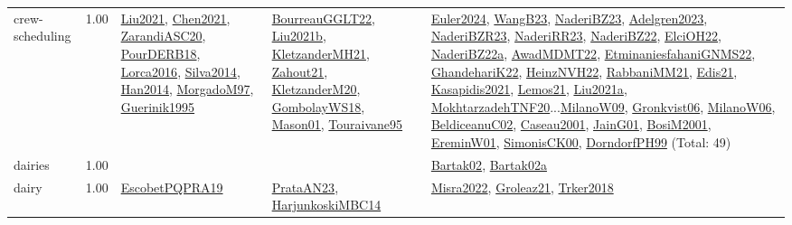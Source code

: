 {\begin{longtable}{p{3cm}r>{\raggedright\arraybackslash}p{6cm}>{\raggedright\arraybackslash}p{6cm}>{\raggedright\arraybackslash}p{8cm}}
\index{crew-scheduling}\index{ApplicationAreas!crew-scheduling}crew-scheduling &  1.00 & \hyperref[detail:Liu2021]{Liu2021}, \hyperref[detail:Chen2021]{Chen2021}, \hyperref[detail:ZarandiASC20]{ZarandiASC20}, \hyperref[detail:PourDERB18]{PourDERB18}, \hyperref[detail:Lorca2016]{Lorca2016}, \hyperref[detail:Silva2014]{Silva2014}, \hyperref[detail:Han2014]{Han2014}, \hyperref[detail:MorgadoM97]{MorgadoM97}, \hyperref[detail:Guerinik1995]{Guerinik1995} & \hyperref[detail:BourreauGGLT22]{BourreauGGLT22}, \hyperref[detail:Liu2021b]{Liu2021b}, \hyperref[detail:KletzanderMH21]{KletzanderMH21}, \hyperref[detail:Zahout21]{Zahout21}, \hyperref[detail:KletzanderM20]{KletzanderM20}, \hyperref[detail:GombolayWS18]{GombolayWS18}, \hyperref[detail:Mason01]{Mason01}, \hyperref[detail:Touraivane95]{Touraivane95} & \hyperref[detail:Euler2024]{Euler2024}, \hyperref[detail:WangB23]{WangB23}, \hyperref[detail:NaderiBZ23]{NaderiBZ23}, \hyperref[detail:Adelgren2023]{Adelgren2023}, \hyperref[detail:NaderiBZR23]{NaderiBZR23}, \hyperref[detail:NaderiRR23]{NaderiRR23}, \hyperref[detail:NaderiBZ22]{NaderiBZ22}, \hyperref[detail:ElciOH22]{ElciOH22}, \hyperref[detail:NaderiBZ22a]{NaderiBZ22a}, \hyperref[detail:AwadMDMT22]{AwadMDMT22}, \hyperref[detail:EtminaniesfahaniGNMS22]{EtminaniesfahaniGNMS22}, \hyperref[detail:GhandehariK22]{GhandehariK22}, \hyperref[detail:HeinzNVH22]{HeinzNVH22}, \hyperref[detail:RabbaniMM21]{RabbaniMM21}, \hyperref[detail:Edis21]{Edis21}, \hyperref[detail:Kasapidis2021]{Kasapidis2021}, \hyperref[detail:Lemos21]{Lemos21}, \hyperref[detail:Liu2021a]{Liu2021a}, \hyperref[detail:MokhtarzadehTNF20]{MokhtarzadehTNF20}...\hyperref[detail:MilanoW09]{MilanoW09}, \hyperref[detail:Gronkvist06]{Gronkvist06}, \hyperref[detail:MilanoW06]{MilanoW06}, \hyperref[detail:BeldiceanuC02]{BeldiceanuC02}, \hyperref[detail:Caseau2001]{Caseau2001}, \hyperref[detail:JainG01]{JainG01}, \hyperref[detail:BosiM2001]{BosiM2001}, \hyperref[detail:EreminW01]{EreminW01}, \hyperref[detail:SimonisCK00]{SimonisCK00}, \hyperref[detail:DorndorfPH99]{DorndorfPH99} (Total: 49)\\
\index{dairies}\index{ApplicationAreas!dairies}dairies &  1.00 &  &  & \hyperref[detail:Bartak02]{Bartak02}, \hyperref[detail:Bartak02a]{Bartak02a}\\
\index{dairy}\index{ApplicationAreas!dairy}dairy &  1.00 & \hyperref[detail:EscobetPQPRA19]{EscobetPQPRA19} & \hyperref[detail:PrataAN23]{PrataAN23}, \hyperref[detail:HarjunkoskiMBC14]{HarjunkoskiMBC14} & \hyperref[detail:Misra2022]{Misra2022}, \hyperref[detail:Groleaz21]{Groleaz21}, \hyperref[detail:Trker2018]{Trker2018}\\

\end{longtable}}
